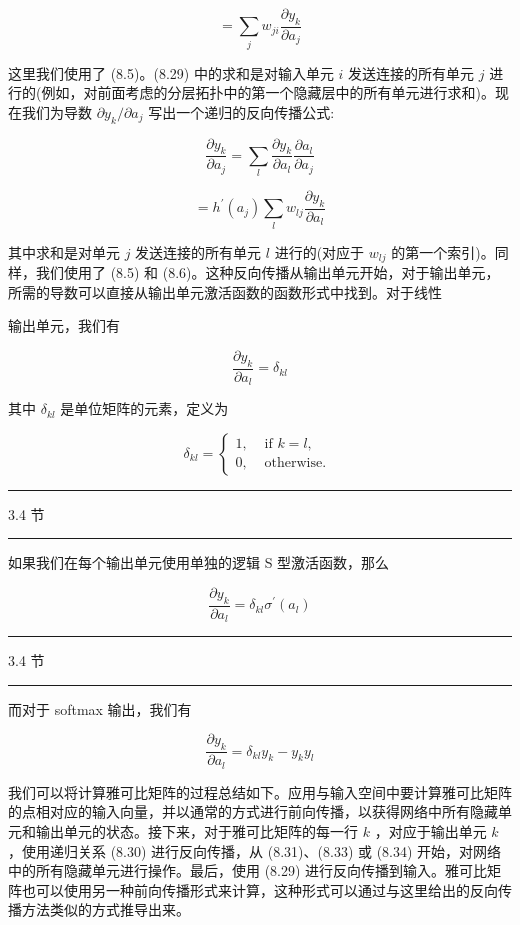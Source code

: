 \documentclass[10pt]{article}
\newcommand{\HRule}{\begin{center}\rule{0.9\linewidth}{0.2mm}\end{center}}
\begin{document}
\[
= \mathop{\sum }\limits_{j}{w}_{ji}\frac{\partial {y}_{k}}{\partial {a}_{j}} \tag{8.29}
\]

这里我们使用了 (8.5)。(8.29) 中的求和是对输入单元 \(i\) 发送连接的所有单元 \(j\) 进行的(例如，对前面考虑的分层拓扑中的第一个隐藏层中的所有单元进行求和)。现在我们为导数 \(\partial {y}_{k}/\partial {a}_{j}\) 写出一个递归的反向传播公式:

\[
\frac{\partial {y}_{k}}{\partial {a}_{j}} = \mathop{\sum }\limits_{l}\frac{\partial {y}_{k}}{\partial {a}_{l}}\frac{\partial {a}_{l}}{\partial {a}_{j}}
\]

\[
= {h}^{\prime }\left( {a}_{j}\right) \mathop{\sum }\limits_{l}{w}_{lj}\frac{\partial {y}_{k}}{\partial {a}_{l}} \tag{8.30}
\]

其中求和是对单元 \(j\) 发送连接的所有单元 \(l\) 进行的(对应于 \({w}_{lj}\) 的第一个索引)。同样，我们使用了 (8.5) 和 (8.6)。这种反向传播从输出单元开始，对于输出单元，所需的导数可以直接从输出单元激活函数的函数形式中找到。对于线性

输出单元，我们有

\[
\frac{\partial {y}_{k}}{\partial {a}_{l}} = {\delta }_{kl} \tag{8.31}
\]

其中 \({\delta }_{kl}\) 是单位矩阵的元素，定义为

\[
{\delta }_{kl} = \left\{  \begin{array}{ll} 1, & \text{ if }k = l, \\  0, & \text{ otherwise. } \end{array}\right.  \tag{8.32}
\]

\HRule

3.4 节

\HRule

如果我们在每个输出单元使用单独的逻辑 S 型激活函数，那么

\[
\frac{\partial {y}_{k}}{\partial {a}_{l}} = {\delta }_{kl}{\sigma }^{\prime }\left( {a}_{l}\right)  \tag{8.33}
\]

\HRule

3.4 节

\HRule

而对于 softmax 输出，我们有

\[
\frac{\partial {y}_{k}}{\partial {a}_{l}} = {\delta }_{kl}{y}_{k} - {y}_{k}{y}_{l} \tag{8.34}
\]

我们可以将计算雅可比矩阵的过程总结如下。应用与输入空间中要计算雅可比矩阵的点相对应的输入向量，并以通常的方式进行前向传播，以获得网络中所有隐藏单元和输出单元的状态。接下来，对于雅可比矩阵的每一行 \(k\) ，对应于输出单元 \(k\) ，使用递归关系 (8.30) 进行反向传播，从 (8.31)、(8.33) 或 (8.34) 开始，对网络中的所有隐藏单元进行操作。最后，使用 (8.29) 进行反向传播到输入。雅可比矩阵也可以使用另一种前向传播形式来计算，这种形式可以通过与这里给出的反向传播方法类似的方式推导出来。
\end{document}
